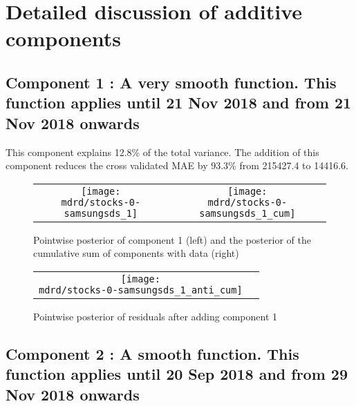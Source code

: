 \documentclass{article} %
\begin{document}
\section{Detailed discussion of additive components}
\label{sec:discussion}

\subsection{Component 1 : A very smooth function. This function applies until 21 Nov 2018 and from 21 Nov 2018 onwards}



This component explains 12.8\% of the total variance.
The addition of this component reduces the cross validated MAE by 93.3\% from 215427.4 to 14416.6.


\begin{figure}[H]
\newcommand{\wmgd}{0.5\columnwidth}
\newcommand{\hmgd}{3.0cm}
\newcommand{\mdrd}{stocks-0-samsungsds}
\newcommand{\mbm}{\hspace{-0.3cm}}
\begin{tabular}{cc}
\mbm \texttt{[image: \\mdrd/stocks-0-samsungsds\_1]} & \texttt{[image: \\mdrd/stocks-0-samsungsds\_1\_cum]}
\end{tabular}
\caption{Pointwise posterior of component 1 (left) and the posterior of the cumulative sum of components with data (right)}
\label{fig:comp1}
\end{figure}

\begin{figure}[H]
\newcommand{\wmgd}{0.5\columnwidth}
\newcommand{\hmgd}{3.0cm}
\newcommand{\mdrd}{stocks-0-samsungsds}
\newcommand{\mbm}{\hspace{-0.3cm}}
\begin{tabular}{cc}
\mbm \texttt{[image: \\mdrd/stocks-0-samsungsds\_1\_anti\_cum]}
\end{tabular}
\caption{Pointwise posterior of residuals after adding component 1}
\label{fig:comp1}
\end{figure}

\subsection{Component 2 : A smooth function. This function applies until 20 Sep 2018 and from 29 Nov 2018 onwards}


\end{document}
